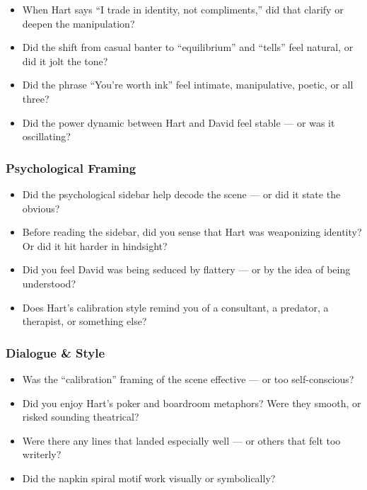 \begin{itemize}
    \item When Hart says “I trade in identity, not compliments,” did that clarify or deepen the manipulation?
    \item Did the shift from casual banter to “equilibrium” and “tells” feel natural, or did it jolt the tone?
    \item Did the phrase “You’re worth ink” feel intimate, manipulative, poetic, or all three?
    \item Did the power dynamic between Hart and David feel stable — or was it oscillating?
\end{itemize}

\subsubsection*{Psychological Framing}

\begin{itemize}
    \item Did the psychological sidebar help decode the scene — or did it state the obvious?
    \item Before reading the sidebar, did you sense that Hart was weaponizing identity? Or did it hit harder in hindsight?
    \item Did you feel David was being seduced by flattery — or by the idea of being understood?
    \item Does Hart’s calibration style remind you of a consultant, a predator, a therapist, or something else?
\end{itemize}

\subsubsection*{Dialogue \& Style}

\begin{itemize}
    \item Was the “calibration” framing of the scene effective — or too self-conscious?
    \item Did you enjoy Hart’s poker and boardroom metaphors? Were they smooth, or risked sounding theatrical?
    \item Were there any lines that landed especially well — or others that felt too writerly?
    \item Did the napkin spiral motif work visually or symbolically?
\end{itemize}

